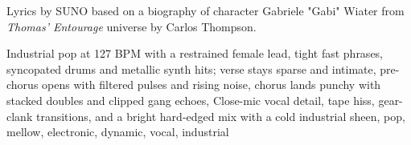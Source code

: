 
\begin{notes}
Lyrics by SUNO based on a biography of character Gabriele "Gabi" Wiater from \emph{Thomas’ Entourage} universe by Carlos Thompson.
\end{notes}
\begin{style}
Industrial pop at 127 BPM with a restrained female lead, tight fast phrases, syncopated drums and metallic synth hits; verse stays sparse and intimate, pre-chorus opens with filtered pulses and rising noise, chorus lands punchy with stacked doubles and clipped gang echoes, Close-mic vocal detail, tape hiss, gear-clank transitions, and a bright hard-edged mix with a cold industrial sheen, pop, mellow, electronic, dynamic, vocal, industrial
\end{style}
